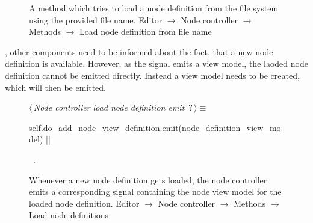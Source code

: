 \documentclass[%
    a4paper,    %
    justified,  %
    nobib,      %
    openany     %
]{tufte-book}
\begin{document}
\begin{figure}
\begin{flushleft}
\begin{minipage}{\linewidth}
\begin{list}{}{\setlength{\itemsep}{-\parsep}\setlength{\itemindent}{-\leftmargin}}
\item{}
\end{list}
\end{minipage}\vspace{4ex}
\end{flushleft}
\caption{A method which tries to load a node definition from the
  file system using the provided file name.
  \newline{}\newline{}Editor $\rightarrow$ Node controller $\rightarrow$
  Methods $\rightarrow$ Load node definition from file name}
\label{editor:lst:node-controller:methods:load-node-definition-from-file-name}
\end{figure}

, other components need
to be informed about the fact, that a new node definition is available. However,
as the signal emits a view model, the laoded node definition cannot be emitted
directly. Instead a view model needs to be created, which will then be emitted.

\begin{figure}
\begin{flushleft} \small
\begin{minipage}{\linewidth}\label{scrap125}\raggedright\small
{} $\langle\,${\itshape Node controller load node definition emit}\nobreak\ {\footnotesize {?}}$\,\rangle\equiv$
\vspace{-1ex}
\begin{pythoncode}
self.do_add_node_view_definition.emit(node_definition_view_model)
|\NWsep|
\end{pythoncode}
\vspace{1.5ex}
\footnotesize
\begin{list}{}{\setlength{\itemsep}{-\parsep}\setlength{\itemindent}{-\leftmargin}}
\item \NWtxtMacroRefIn\ .

\item{}
\end{list}
\end{minipage}\vspace{4ex}
\end{flushleft}
\caption{Whenever a new node definition gets loaded, the node controller emits a
  corresponding signal containing the node view model for the loaded node definition.
  \newline{}\newline{}Editor $\rightarrow$ Node controller $\rightarrow$
  Methods $\rightarrow$ Load node definitions}
\label{editor:lst:node-controller:methods:load-node-definitions:do-add-node-view-definition}
\end{figure}
\end{document}
